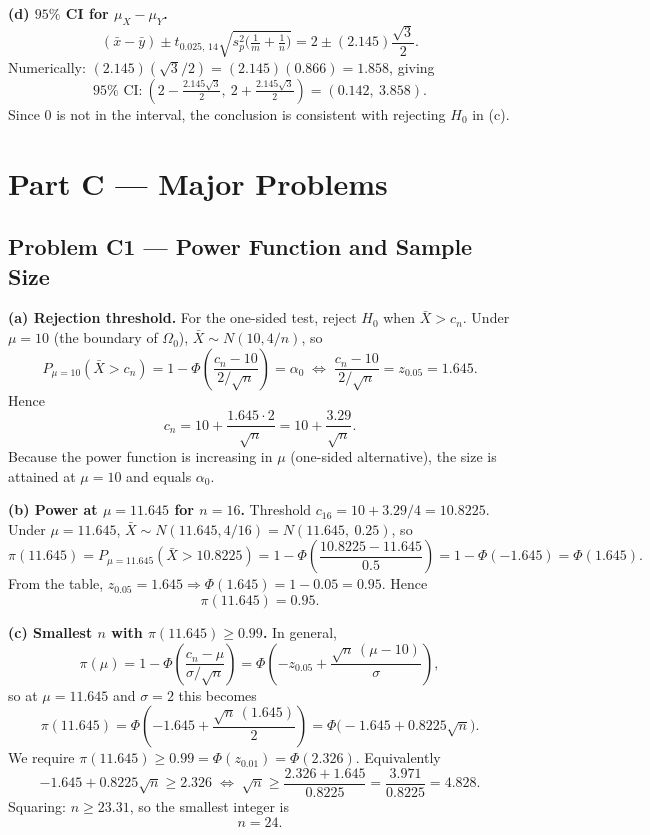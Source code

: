 \documentclass[11pt]{article}
\begin{document}
\textbf{(d) $95\%$ CI for $\mu_X - \mu_Y$.}
\[
(\bar{x} - \bar{y}) \pm t_{0.025,\,14}\sqrt{s_p^2\bigl(\tfrac{1}{m}+\tfrac{1}{n}\bigr)}
= 2 \pm (2.145)\frac{\sqrt{3}}{2}.
\]
Numerically: $(2.145)(\sqrt{3}/2) = (2.145)(0.866) = 1.858$, giving
\[
\boxed{95\% \text{ CI:}\ \left(2 - \tfrac{2.145\sqrt{3}}{2},\ 2 + \tfrac{2.145\sqrt{3}}{2}\right) = (0.142,\ 3.858).}
\]
Since $0$ is not in the interval, the conclusion is consistent with rejecting $H_0$ in (c).

\section*{Part C --- Major Problems}

\subsection*{Problem C1 --- Power Function and Sample Size}

\textbf{(a) Rejection threshold.} For the one-sided test, reject $H_0$ when $\bar{X} > c_n$. Under $\mu = 10$ (the boundary of $\Omega_0$), $\bar{X} \sim N(10, 4/n)$, so
\[
P_{\mu=10}(\bar{X} > c_n) = 1 - \Phi\!\left(\frac{c_n - 10}{2/\sqrt{n}}\right) = \alpha_0
\;\Longleftrightarrow\;
\frac{c_n - 10}{2/\sqrt{n}} = z_{0.05} = 1.645.
\]
Hence
\[
\boxed{c_n = 10 + \frac{1.645 \cdot 2}{\sqrt{n}} = 10 + \frac{3.29}{\sqrt{n}}.}
\]
Because the power function is increasing in $\mu$ (one-sided alternative), the size is attained at $\mu = 10$ and equals $\alpha_0$.

\textbf{(b) Power at $\mu = 11.645$ for $n = 16$.} Threshold $c_{16} = 10 + 3.29/4 = 10.8225$. Under $\mu = 11.645$, $\bar{X} \sim N(11.645, 4/16) = N(11.645,\ 0.25)$, so
\[
\pi(11.645) = P_{\mu=11.645}(\bar{X} > 10.8225)
= 1 - \Phi\!\left(\frac{10.8225 - 11.645}{0.5}\right)
= 1 - \Phi(-1.645)
= \Phi(1.645).
\]
From the table, $z_{0.05} = 1.645 \Rightarrow \Phi(1.645) = 1 - 0.05 = 0.95$. Hence
\[
\boxed{\pi(11.645) = 0.95.}
\]

\textbf{(c) Smallest $n$ with $\pi(11.645) \ge 0.99$.} In general,
\[
\pi(\mu) = 1 - \Phi\!\left(\frac{c_n - \mu}{\sigma/\sqrt{n}}\right)
= \Phi\!\left(-z_{0.05} + \frac{\sqrt{n}\,(\mu - 10)}{\sigma}\right),
\]
so at $\mu = 11.645$ and $\sigma = 2$ this becomes
\[
\pi(11.645) = \Phi\!\left(-1.645 + \frac{\sqrt{n}\,(1.645)}{2}\right) = \Phi\!\bigl(-1.645 + 0.8225\sqrt{n}\bigr).
\]
We require $\pi(11.645) \ge 0.99 = \Phi(z_{0.01}) = \Phi(2.326)$. Equivalently
\[
-1.645 + 0.8225\sqrt{n} \ge 2.326
\;\Longleftrightarrow\;
\sqrt{n} \ge \frac{2.326 + 1.645}{0.8225} = \frac{3.971}{0.8225} = 4.828.
\]
Squaring: $n \ge 23.31$, so the smallest integer is
\[
\boxed{n = 24.}
\]
\end{document}
